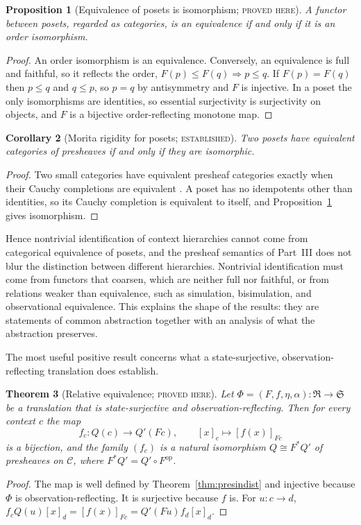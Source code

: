 \documentclass[11pt]{article}
\newtheorem{theorem}{Theorem}[section]
\newtheorem{proposition}[theorem]{Proposition}
\newtheorem{corollary}[theorem]{Corollary}
\theoremstyle{definition}
\theoremstyle{remark}
\newcommand{\stE}{\textsc{established}}
\newcommand{\stN}{\textsc{proved here}}
\newcommand{\cC}{\mathcal C}
\newcommand{\fR}{\mathfrak R}
\newcommand{\fS}{\mathfrak S}
\newcommand{\op}{\mathrm{op}}
\begin{document}
\begin{proposition}[Equivalence of posets is isomorphism; \stN]\label{prop:posetrigid}
A functor between posets, regarded as categories, is an equivalence if and only if it is an order isomorphism.
\end{proposition}
\begin{proof}
An order isomorphism is an equivalence. Conversely, an equivalence is full and faithful, so it reflects the order, $F(p)\le F(q)\Rightarrow p\le q$. If $F(p)=F(q)$ then $p\le q$ and $q\le p$, so $p=q$ by antisymmetry and $F$ is injective. In a poset the only isomorphisms are identities, so essential surjectivity is surjectivity on objects, and $F$ is a bijective order-reflecting monotone map.
\end{proof}

\begin{corollary}[Morita rigidity for posets; \stE]\label{cor:morita}
Two posets have equivalent categories of presheaves if and only if they are isomorphic.
\end{corollary}
\begin{proof}
Two small categories have equivalent presheaf categories exactly when their Cauchy completions are equivalent \cite{borceux}. A poset has no idempotents other than identities, so its Cauchy completion is equivalent to itself, and Proposition~\ref{prop:posetrigid} gives isomorphism.
\end{proof}

Hence nontrivial identification of context hierarchies cannot come from categorical equivalence of posets, and the presheaf semantics of Part~III does not blur the distinction between different hierarchies. Nontrivial identification must come from functors that coarsen, which are neither full nor faithful, or from relations weaker than equivalence, such as simulation, bisimulation, and observational equivalence. This explains the shape of the results: they are statements of common abstraction together with an analysis of what the abstraction preserves.

The most useful positive result concerns what a state-surjective, observation-reflecting translation does establish.

\begin{theorem}[Relative equivalence; \stN]\label{thm:relequiv}
Let $\Phi=(F,f,\eta,\alpha):\fR\to\fS$ be a translation that is state-surjective and observation-reflecting. Then for every context $c$ the map
\[
f_c:Q(c)\to Q'(Fc),\qquad[x]_c\mapsto[f(x)]_{Fc}
\]
is a bijection, and the family $(f_c)$ is a natural isomorphism $Q\cong F^{\ast}Q'$ of presheaves on $\cC$, where $F^{\ast}Q'=Q'\circ F^{\op}$.
\end{theorem}
\begin{proof}
The map is well defined by Theorem~\ref{thm:presindist} and injective because $\Phi$ is observation-reflecting. It is surjective because $f$ is. For $u:c\to d$, $f_cQ(u)[x]_d=[f(x)]_{Fc}=Q'(Fu)f_d[x]_d$.
\end{proof}
\end{document}
